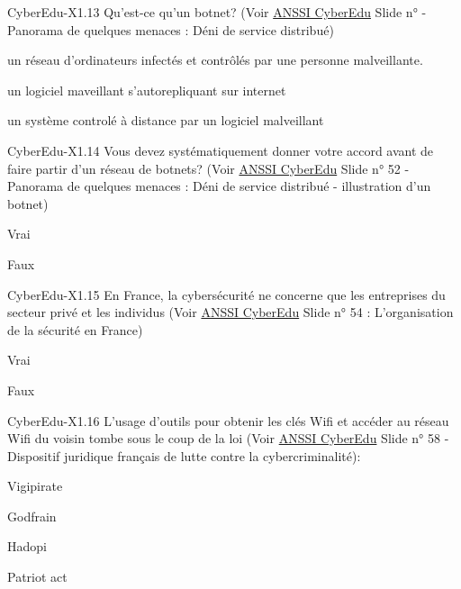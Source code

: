 \begin{multi}[multiple=true]{CyberEdu-X1.13}
	Qu'est-ce qu'un botnet? (Voir \href{https://www.ssi.gouv.fr/administration/formations/cyberedu/contenu-pedagogique-cyberedu/}{ANSSI CyberEdu} Slide n° -  Panorama de quelques menaces : Déni de service distribué)
\item*  un réseau d'ordinateurs infectés et contrôlés par une personne malveillante.
\item un logiciel maveillant s'autorepliquant sur internet
\item un système controlé à distance par un logiciel malveillant
\end{multi}

\begin{multi}[multiple=true]{CyberEdu-X1.14}
	Vous devez systématiquement donner votre accord avant de faire partir d'un réseau de botnets? (Voir \href{https://www.ssi.gouv.fr/administration/formations/cyberedu/contenu-pedagogique-cyberedu/}{ANSSI CyberEdu} Slide n° 52 - Panorama de quelques menaces : Déni de service distribué - illustration d'un botnet)
\item 	Vrai
\item* 	Faux
\end{multi}

\begin{multi}[multiple=true]{CyberEdu-X1.15}
	En France, la cybersécurité ne concerne que les entreprises du secteur privé et les individus (Voir \href{https://www.ssi.gouv.fr/administration/formations/cyberedu/contenu-pedagogique-cyberedu/}{ANSSI CyberEdu} Slide n° 54 : L'organisation de la sécurité en France)
\item 	Vrai
\item* 	Faux
\end{multi}

\begin{multi}[multiple=true]{CyberEdu-X1.16}
	L'usage d'outils pour obtenir les clés Wifi et accéder au réseau  Wifi du voisin tombe sous le coup de la loi (Voir \href{https://www.ssi.gouv.fr/administration/formations/cyberedu/contenu-pedagogique-cyberedu/}{ANSSI CyberEdu} Slide n° 58 - Dispositif juridique français de lutte contre la cybercriminalité):
\item 	Vigipirate
\item* 	Godfrain
\item 	Hadopi
\item 	Patriot act
\end{multi}

